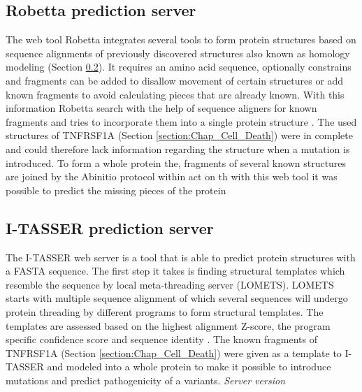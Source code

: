 \subsection{Robetta prediction server}
The web tool Robetta integrates several tools to form protein structures based on sequence alignments of previously discovered structures also known as homology modeling (Section \ref{}). It requires an amino acid sequence, optionally constrains and fragments can be added to disallow movement of certain structures or add known fragments to avoid calculating pieces that are already known. With this information Robetta search with the help of sequence aligners for known fragments and tries to incorporate them into a single protein structure \cite{}.
The used structures of TNFRSF1A (Section \ref{section:Chap_Cell_Death}) were in complete and could therefore lack information regarding the structure when a mutation is introduced. To form a whole protein the, fragments of several known structures are joined by the Abinitio protocol within act on th with this web tool it was possible to predict the missing pieces of the protein
\label{subsec:MM_Robetta}

\subsection{I-TASSER prediction server}
The I-TASSER web server is a tool that is able to predict protein structures with a FASTA sequence. The first step it takes is finding structural templates which resemble the sequence by local meta-threading server (LOMETS). LOMETS starts with multiple sequence alignment of which several sequences will undergo protein threading by different programs to form structural templates. The templates are assessed based on the highest alignment Z-score, the program specific confidence score and sequence identity \cite{}.
The known fragments of TNFRSF1A (Section \ref{section:Chap_Cell_Death}) were given as a template to I-TASSER and modeled into a whole protein to make it possible to introduce mutations and predict pathogenicity of a variants.
\label{subsec:MM_I_TASSER}
\newline
\textit{Server version}

